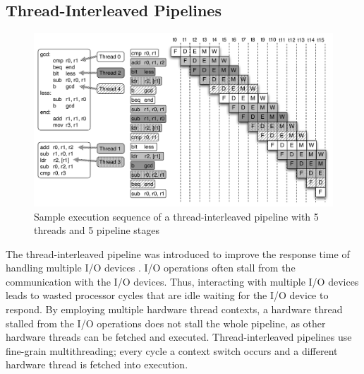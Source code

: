 \subsection{Thread-Interleaved Pipelines}
\label{section:pret_thread_pipeline}
\begin{figure}
  \vspace{-20pt}
  \begin{center}
    \includegraphics[scale=.55]{figs/thread-interleaved-execution}
  \end{center}
  \vspace{-20pt}
  \caption{Sample execution sequence of a thread-interleaved pipeline with 5 threads and 5 pipeline stages}
  \label{fig:execution_thread_interleaved_pipeline}
\end{figure}
The thread-interleaved pipeline was introduced to improve the response time of handling multiple I/O devices .
I/O operations often stall from the communication with the I/O devices.
Thus, interacting with multiple I/O devices leads to wasted processor cycles that are idle waiting for the I/O device to respond.
By employing multiple hardware thread contexts, a hardware thread stalled from the I/O operations does not stall the whole pipeline, as other hardware threads can be fetched and executed.
Thread-interleaved pipelines use fine-grain multithreading; every cycle a context switch occurs and a different hardware thread is fetched into execution. 
